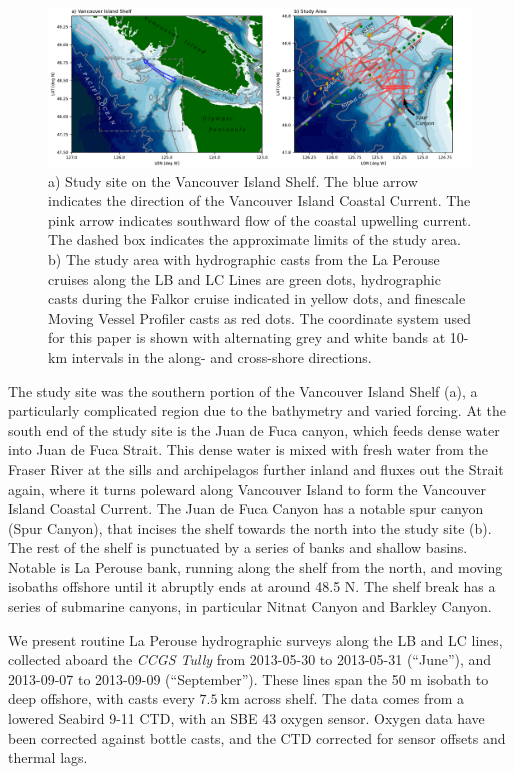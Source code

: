 \documentclass[draft]{agujournal2019}
\begin{document}
\begin{figure}[htbp]
  \includegraphics[width=5in]{LocMapBoth.pdf}
  \caption{a) Study site on the Vancouver Island Shelf.  The blue arrow indicates the direction of the Vancouver Island Coastal Current.  The pink arrow indicates southward flow of the coastal upwelling current.  The dashed box indicates the approximate limits of the study area.  b) The study area with hydrographic casts from the La Perouse cruises along the LB and LC Lines are green dots, hydrographic casts during the Falkor cruise indicated in yellow dots, and finescale Moving Vessel Profiler casts as red dots.  The coordinate system used for this paper is shown with alternating grey and white bands at 10-km intervals in the along- and cross-shore directions.}
  \label{fig:LocMapBoth}
\end{figure}


The study site was the southern portion of the Vancouver Island Shelf (a), a particularly complicated region due to the bathymetry and varied forcing.  At the south end of the study site is the Juan de Fuca canyon, which feeds dense water into Juan de Fuca Strait.  This dense water is mixed with fresh water from the Fraser River at the sills and archipelagos further inland and fluxes out the Strait again, where it turns poleward along Vancouver Island to form the Vancouver Island Coastal Current.  The Juan de Fuca Canyon has a notable spur canyon (Spur Canyon), that incises the shelf towards the north into the study site (b).  The rest of the shelf is punctuated by a series of banks and shallow basins.  Notable is La Perouse bank, running along the shelf from the north, and moving isobaths offshore until it abruptly ends at around 48.5 N. The shelf break has a series of submarine canyons, in particular Nitnat Canyon and Barkley Canyon.

We present routine La Perouse hydrographic surveys along the LB and LC lines, collected aboard the \emph{CCGS Tully} from 2013-05-30 to 2013-05-31  (``June''), and 2013-09-07 to 2013-09-09 (``September'').  These lines span the 50 m isobath to deep offshore, with casts every $7.5\ \mathrm{km}$ across shelf. The data comes from a lowered Seabird 9-11 CTD, with an SBE 43 oxygen sensor.  Oxygen data have been corrected against bottle casts, and the CTD corrected for sensor offsets and thermal lags.
\end{document}
